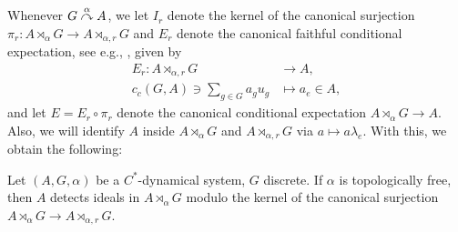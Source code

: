 	Whenever $G \stackrel{\alpha}{\curvearrowright} A$, we let $I_r$ denote the kernel of the canonical surjection $ \pi_r \colon A \rtimes_\alpha G \to A \rtimes_{\alpha , r}G$ and $E_r$ denote the canonical faithful conditional expectation, see e.g., \cite[Proposition 4.1.9]{brown2008c}, given by
	\begin{align*}
	E_r \colon A \rtimes_{\alpha,r} G &\to A, \\ 
		c_c(G,A) \ni \sum_{g \in G} a_g  u_g &\mapsto a_e \in A,
	\end{align*}
	and let $E = E_r \circ \pi_r$ denote the canonical conditional expectation $A \rtimes_{\alpha }G \to A$. Also, we will identify $A$ inside $A \rtimes_\alpha G$ and $A \rtimes_{\alpha,r}G$ via $a \mapsto a\lambda_e$.	
With this, we obtain the following:
\begin{theorem}
	Let $(A,G,\alpha)$ be a $C^*$-dynamical system, $G$ discrete. If $\alpha$ is topologically free, then $A$ detects ideals in $A \rtimes_{\alpha}G$ modulo the kernel of the canonical surjection $A \rtimes_\alpha G \to A \rtimes_{\alpha,r}G$. 
	\label{ASthm1}
\end{theorem}
